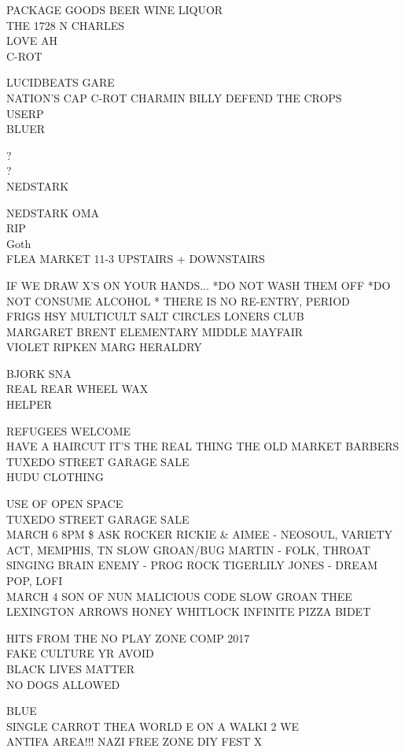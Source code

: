 \documentclass[10pt,letterpaper]{article}
\begin{document}
PACKAGE GOODS BEER WINE LIQUOR\\
THE 1728 N CHARLES\\
LOVE AH\\
C{-}ROT

LUCIDBEATS GARE\\
NATION'S CAP C{-}ROT CHARMIN BILLY DEFEND THE CROPS\\
USERP\\
BLUER

?\\
?\\
NEDSTARK

NEDSTARK OMA\\
RIP\\
Goth\\
FLEA MARKET 11{-}3 UPSTAIRS + DOWNSTAIRS

IF WE DRAW X'S ON YOUR HANDS... *DO NOT WASH THEM OFF *DO NOT CONSUME ALCOHOL * THERE IS NO RE{-}ENTRY, PERIOD\\
FRIGS HSY MULTICULT SALT CIRCLES LONERS CLUB\\
MARGARET BRENT ELEMENTARY MIDDLE MAYFAIR\\
VIOLET RIPKEN MARG HERALDRY

BJORK SNA\\
REAL REAR WHEEL WAX\\
HELPER

REFUGEES WELCOME\\
HAVE A HAIRCUT IT'S THE REAL THING THE OLD MARKET BARBERS\\
TUXEDO STREET GARAGE SALE\\
HUDU CLOTHING

USE OF OPEN SPACE\\
TUXEDO STREET GARAGE SALE\\
MARCH 6 8PM \$ ASK ROCKER RICKIE \& AIMEE {-} NEOSOUL, VARIETY ACT, MEMPHIS, TN SLOW GROAN/BUG MARTIN {-} FOLK, THROAT SINGING BRAIN ENEMY {-} PROG ROCK TIGERLILY JONES {-} DREAM POP, LOFI\\
MARCH 4 SON OF NUN MALICIOUS CODE SLOW GROAN THEE LEXINGTON ARROWS HONEY WHITLOCK INFINITE PIZZA BIDET

HITS FROM THE NO PLAY ZONE COMP 2017\\
FAKE CULTURE YR AVOID\\
BLACK LIVES MATTER\\
NO DOGS ALLOWED

BLUE\\
SINGLE CARROT THEA WORLD E ON A WALKI 2 WE\\
ANTIFA AREA!!! NAZI FREE ZONE DIY FEST X
\end{document}
